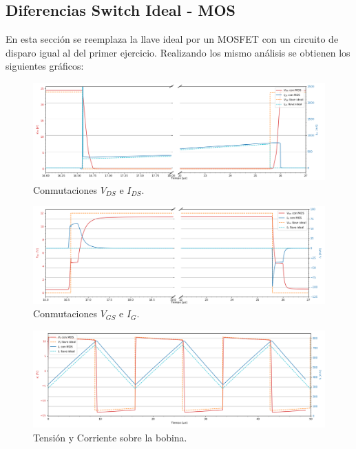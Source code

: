 %

%

\subsection{Diferencias Switch Ideal - MOS}
En esta sección se reemplaza la llave ideal por un MOSFET con un circuito de disparo igual al del primer ejercicio. Realizando los mismo análisis se obtienen los siguientes gráficos:


\begin{figure}[H]
	\centering
	\includegraphics[width=\linewidth]{ImagenesEjercicio-3/ids-vds-2v3}
	\caption{Conmutaciones $V_{DS}$ e  $I_{DS}$.}
	\label{fig:ej3:conmutacionON_OFF_VDS_IDS}
\end{figure}
\begin{figure}[H]
	\centering
	\includegraphics[width=\linewidth]{ImagenesEjercicio-3/ig-vgs-2v3}
	\caption{Conmutaciones $V_{GS}$ e  $I_{G}$.}
	\label{fig:ej3:conmutacionON_OFF_VGS_IG}
\end{figure}
\begin{figure}[H]
	\centering
	\includegraphics[width=\linewidth]{ImagenesEjercicio-3/il-vl-2v3}
	\caption{Tensión y Corriente sobre la bobina.}
	\label{fig:ej3:Il_Vl}
\end{figure}
